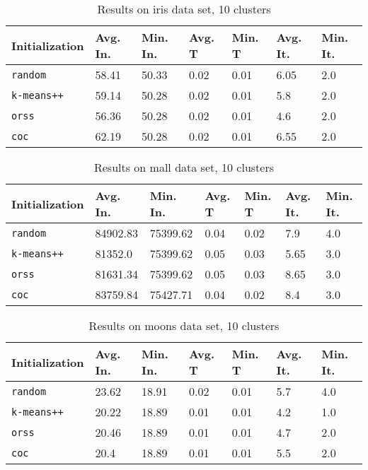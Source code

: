 \begin{table}[h]
	\begin{center}
		\begin{tabular}{|l|l|l|l|l|l|l|}
			\hline
			Initialization & Avg. In. & Min. In. & Avg. T & Min. T & Avg. It. & Min. It.\\\hline
			\texttt{random} & 58.41 & 50.33 & 0.02 & 0.01 & 6.05 & 2.0\\\hline
			\texttt{k-means++} & 59.14 & 50.28 & 0.02 & 0.01 & 5.8 & 2.0\\\hline
			\texttt{orss} & 56.36 & 50.28 & 0.02 & 0.01 & 4.6 & 2.0\\\hline
			\texttt{coc} & 62.19 & 50.28 & 0.02 & 0.01 & 6.55 & 2.0\\\hline
		\end{tabular}
		\caption{Results on iris data set, 10 clusters}
		\label{tbl:iris10}
	\end{center}
\end{table}

\begin{table}[h]
	\begin{center}
		\begin{tabular}{|l|l|l|l|l|l|l|}
			\hline
			Initialization & Avg. In. & Min. In. & Avg. T & Min. T & Avg. It. & Min. It.\\\hline
			\texttt{random} & 84902.83 & 75399.62 & 0.04 & 0.02 & 7.9 & 4.0\\\hline
			\texttt{k-means++} & 81352.0 & 75399.62 & 0.05 & 0.03 & 5.65 & 3.0\\\hline
			\texttt{orss} & 81631.34 & 75399.62 & 0.05 & 0.03 & 8.65 & 3.0\\\hline
			\texttt{coc} & 83759.84 & 75427.71 & 0.04 & 0.02 & 8.4 & 3.0\\\hline
		\end{tabular}
		\caption{Results on mall data set, 10 clusters}
		\label{tbl:mall10}
	\end{center}
\end{table}

\begin{table}[h]
	\begin{center}
		\begin{tabular}{|l|l|l|l|l|l|l|}
			\hline
			Initialization & Avg. In. & Min. In. & Avg. T & Min. T & Avg. It. & Min. It.\\\hline
			\texttt{random} & 23.62 & 18.91 & 0.02 & 0.01 & 5.7 & 4.0\\\hline
			\texttt{k-means++} & 20.22 & 18.89 & 0.01 & 0.01 & 4.2 & 1.0\\\hline
			\texttt{orss} & 20.46 & 18.89 & 0.01 & 0.01 & 4.7 & 2.0\\\hline
			\texttt{coc} & 20.4 & 18.89 & 0.01 & 0.01 & 5.5 & 2.0\\\hline
		\end{tabular}
		\caption{Results on moons data set, 10 clusters}
		\label{tbl:moons10}
	\end{center}
\end{table}

